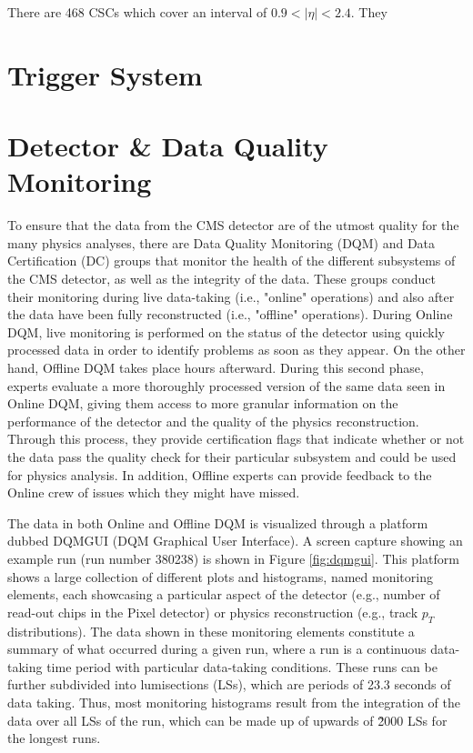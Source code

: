 There are 468 CSCs which cover an interval of $0.9 <|\eta|< 2.4$. They


\section{Trigger System}

\section{Detector \& Data Quality Monitoring}

To ensure that the data from the CMS detector are of the utmost quality for the many physics analyses, there are Data Quality Monitoring (DQM) and Data Certification (DC) groups that monitor the health of the different subsystems of the CMS detector, as well as the integrity of the data. These groups conduct their monitoring during live data-taking (i.e., "online" operations) and also after the data have been fully reconstructed (i.e., "offline" operations). During Online DQM, live monitoring is performed on the status of the detector using quickly processed data in order to identify problems as soon as they appear. On the other hand, Offline DQM takes place hours afterward. During this second phase, experts evaluate a more thoroughly processed version of the same data seen in Online DQM, giving them access to more granular information on the performance of the detector and the quality of the physics reconstruction. Through this process, they provide certification flags that indicate whether or not the data pass the quality check for their particular subsystem and could be used for physics analysis. In addition, Offline experts can provide feedback to the Online crew of issues which they might have missed.

The data in both Online and Offline DQM is visualized through a platform dubbed DQMGUI (DQM Graphical User Interface). A screen capture showing an example run (run number 380238) is shown in Figure \ref{fig:dqmgui}. This platform shows a large collection of different plots and histograms, named monitoring elements, each showcasing a particular aspect of the detector (e.g., number of read-out chips in the Pixel detector) or physics reconstruction (e.g., track $p_T$ distributions). The data shown in these monitoring elements constitute a summary of what occurred during a given run, where a run is a continuous data-taking time period with particular data-taking conditions. These runs can be further subdivided into lumisections (LSs), which are periods of 23.3 seconds of data taking. Thus, most monitoring histograms result from the integration of the data over all LSs of the run, which can be made up of upwards of \~2000 LSs for the longest runs.

